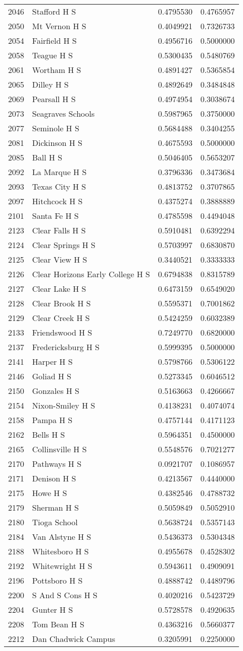 \documentclass[
]{article}
\begin{document}
\begin{longtable}[]{@{}llrr@{}}
2046 & Stafford H S & 0.4795530 & 0.4765957\tabularnewline
2050 & Mt Vernon H S & 0.4049921 & 0.7326733\tabularnewline
2054 & Fairfield H S & 0.4956716 & 0.5000000\tabularnewline
2058 & Teague H S & 0.5300435 & 0.5480769\tabularnewline
2061 & Wortham H S & 0.4891427 & 0.5365854\tabularnewline
2065 & Dilley H S & 0.4892649 & 0.3484848\tabularnewline
2069 & Pearsall H S & 0.4974954 & 0.3038674\tabularnewline
2073 & Seagraves Schools & 0.5987965 & 0.3750000\tabularnewline
2077 & Seminole H S & 0.5684488 & 0.3404255\tabularnewline
2081 & Dickinson H S & 0.4675593 & 0.5000000\tabularnewline
2085 & Ball H S & 0.5046405 & 0.5653207\tabularnewline
2092 & La Marque H S & 0.3796336 & 0.3473684\tabularnewline
2093 & Texas City H S & 0.4813752 & 0.3707865\tabularnewline
2097 & Hitchcock H S & 0.4375274 & 0.3888889\tabularnewline
2101 & Santa Fe H S & 0.4785598 & 0.4494048\tabularnewline
2123 & Clear Falls H S & 0.5910481 & 0.6392294\tabularnewline
2124 & Clear Springs H S & 0.5703997 & 0.6830870\tabularnewline
2125 & Clear View H S & 0.3440521 & 0.3333333\tabularnewline
2126 & Clear Horizons Early College H S & 0.6794838 &
0.8315789\tabularnewline
2127 & Clear Lake H S & 0.6473159 & 0.6549020\tabularnewline
2128 & Clear Brook H S & 0.5595371 & 0.7001862\tabularnewline
2129 & Clear Creek H S & 0.5424259 & 0.6032389\tabularnewline
2133 & Friendswood H S & 0.7249770 & 0.6820000\tabularnewline
2137 & Fredericksburg H S & 0.5999395 & 0.5000000\tabularnewline
2141 & Harper H S & 0.5798766 & 0.5306122\tabularnewline
2146 & Goliad H S & 0.5273345 & 0.6046512\tabularnewline
2150 & Gonzales H S & 0.5163663 & 0.4266667\tabularnewline
2154 & Nixon-Smiley H S & 0.4138231 & 0.4074074\tabularnewline
2158 & Pampa H S & 0.4757144 & 0.4171123\tabularnewline
2162 & Bells H S & 0.5964351 & 0.4500000\tabularnewline
2165 & Collinsville H S & 0.5548576 & 0.7021277\tabularnewline
2170 & Pathways H S & 0.0921707 & 0.1086957\tabularnewline
2171 & Denison H S & 0.4213567 & 0.4440000\tabularnewline
2175 & Howe H S & 0.4382546 & 0.4788732\tabularnewline
2179 & Sherman H S & 0.5059849 & 0.5052910\tabularnewline
2180 & Tioga School & 0.5638724 & 0.5357143\tabularnewline
2184 & Van Alstyne H S & 0.5436373 & 0.5304348\tabularnewline
2188 & Whitesboro H S & 0.4955678 & 0.4528302\tabularnewline
2192 & Whitewright H S & 0.5943611 & 0.4909091\tabularnewline
2196 & Pottsboro H S & 0.4888742 & 0.4489796\tabularnewline
2200 & S And S Cons H S & 0.4020216 & 0.5423729\tabularnewline
2204 & Gunter H S & 0.5728578 & 0.4920635\tabularnewline
2208 & Tom Bean H S & 0.4363216 & 0.5660377\tabularnewline
2212 & Dan Chadwick Campus & 0.3205991 & 0.2250000\tabularnewline

\end{longtable}
\end{document}
